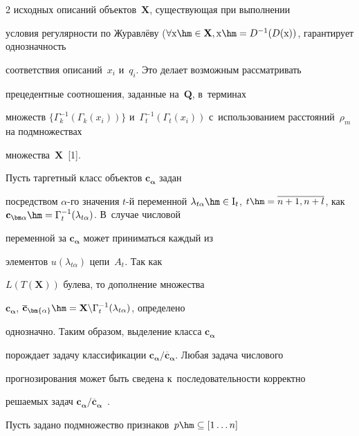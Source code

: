 \begin{multicols}{2}
исходных описаний объектов~$\mathbf{X}$, существующая при выполнении 

условия регулярности по Журавлёву ($\forall \mathrm{x}\hm\in \mathbf{X}, 

\mathrm{x}\hm= D^{-1}(D(\mathrm{x}))$, гарантирует однозначность 

соответствия описаний~$x_i$ и~$q_i$. Это делает возможным рассматривать 

прецедентные соотношения, заданные на~$\mathbf{Q}$, в~терминах 

множеств $\{ \Gamma_k^{-1}(\Gamma_k(x_i))\}$ и~$\Gamma_t^{-1}( 

\Gamma_t(x_i))$ с~использованием расстояний~$\rho_m$ на подмножествах 

множества~$\mathbf{X}$~[1].

     

     Пусть таргетный класс объектов $\mathbf{c}_{\bm{\alpha}}$ задан 

посредством $\alpha$-го значения $t$-й переменной $\lambda_{t\alpha}\hm\in 

\mathrm{I}_t$, $t\hm= \overline{n+1,  n+l}$, как $\mathbf{c}_{{\bm 

\alpha}} \hm= \Gamma_t^{-1}(\lambda_{t\alpha})$. В~случае числовой 

переменной за $\mathbf{c}_{\bm{\alpha}}$ может приниматься каждый из 

элементов $u(\lambda_{t\alpha})$ цепи~$A_t$. Так как 

$L(T(\mathbf{X}))$ булева, то дополнение множества 

$\mathbf{c}_{\bm{\alpha}}$, $\overline{\mathbf{c}}_{\bm{\alpha}} \hm= 

\mathbf{X}\backslash \Gamma_t^{-1}(\lambda_{t\alpha})$, определено 

однозначно. Таким образом, выделение класса $\mathbf{c}_{\bm{\alpha}}$ 

порождает задачу классификации $\mathbf{c}_{\bm{\alpha}}/ 

\overline{\mathbf{c}}_{\bm{\alpha}}$. Любая задача числового 

прогнозирования может быть сведена к~последовательности корректно 

решаемых задач $\mathbf{c}_{\bm{\alpha}}/ 

\overline{\mathbf{c}}_{\bm{\alpha}}$~\cite{5-tor}.

     

     Пусть задано подмножество признаков~$p \hm\subseteq [1\ldots n]$ 


\end{multicols}
